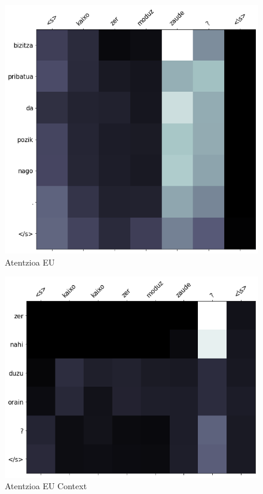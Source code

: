 \documentclass[11pt,a4paper]{article}
\begin{document}
\begin{figure}[ht]
    \centering
    \includegraphics[width=\linewidth]{attention_eu}
    \caption{Atentzioa EU}
    \label{fig:attention_eu}
\end{figure}

\begin{figure}[ht]
    \centering
    \includegraphics[width=\linewidth]{attention_context}
    \caption{Atentzioa EU Context}
    \label{fig:attention_context}
\end{figure}
\end{document}
